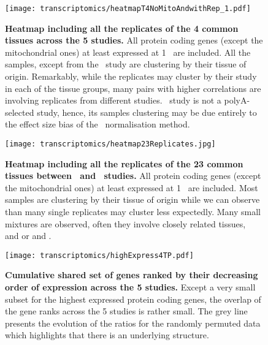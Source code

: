 \begin{figure}[htpb]
    \texttt{[image: transcriptomics/heatmapT4NoMitoAndwithRep\_1.pdf]}\centering
    \caption[Heatmap including all the replicates of the 4 common tissues
    across the 5 studies]{\label{fig:noMitoRep4T}\textbf{Heatmap including all
    the replicates of the 4 common tissues across the 5 studies.} All protein
    coding genes (except the mitochondrial ones)
    at least expressed at 1 \FPKM\ are included. All the samples, except from the
    \castle\ study are clustering by their tissue of origin.
    Remarkably, while the replicates may cluster by their study in each of the
    tissue groups, many pairs with higher correlations are involving replicates
    from different studies. \castle\ study is not a polyA-selected study, hence,
    its samples clustering may be due entirely to the effect size bias of the
    \FPKM\ normalisation method.}
\end{figure}

\begin{figure}[htpb]
    \texttt{[image: transcriptomics/heatmap23Replicates.jpg]}\centering
    \caption[Heatmap including all the replicates of the 23 common tissues
    between Uhlén and GTEx studies]{\label{fig:noMitoRep23T}\textbf{Heatmap
    including all the replicates of the 23 common tissues between \uhlen\ and
    \gtex\ studies.} All protein coding genes (except the mitochondrial ones)
    at least expressed at 1 \FPKM\ are included. Most samples are clustering by
    their tissue of origin while we can observe than many single replicates may
    cluster less expectedly. Many small mixtures are observed, often they involve
    closely related tissues, \ie\  and  or
     and .}
\end{figure}

\begin{figure}[htpb]
\texttt{[image: transcriptomics/highExpress4TP.pdf]}\centering
\caption[Cumulative shared set of genes ranked by expression across the 5
studies]{\label{fig:highExpress4T}\textbf{Cumulative shared set of genes
ranked by their decreasing order of expression across the 5 studies.}
Except a very small subset for the highest expressed protein coding genes,
the overlap of the gene ranks across the 5 studies is rather small.
The grey line presents the evolution of the ratios for the randomly
permuted data which highlights that there is an underlying structure.}
\end{figure}

